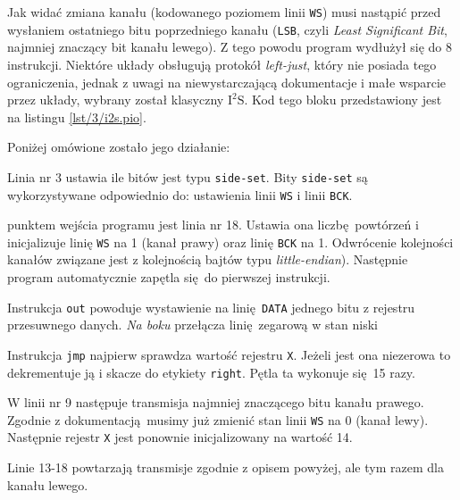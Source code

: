 \documentclass[polish]{aghengthesis}
\let\tempone\itemize
\let\temptwo\enditemize
\renewenvironment{itemize}{\tempone\setlength{\itemsep}{0cm}}{\temptwo}
\newcommand{\isqs}{$\text{I}^{2}\text{S}$}
\newcommand{\lstfile}[3]{
	\noindent
	\hspace{0.1\linewidth}
	\begin{minipage}{0.8\linewidth}
		
	\end{minipage}
	\vspace{0.3cm}
}
\begin{document}
			Jak widać zmiana kanału (kodowanego poziomem linii \lstinline|WS|)  musi nastąpić przed wysłaniem ostatniego bitu poprzedniego kanału (\lstinline|LSB|, czyli \textit{Least Significant Bit}, najmniej znaczący bit kanału lewego). Z tego powodu program wydłużył się do 8 instrukcji. Niektóre układy obsługują protokół \textit{left-just}, który nie posiada tego ograniczenia, jednak z uwagi na niewystarczającą dokumentacje i małe wsparcie przez układy, wybrany został klasyczny \isqs{}. Kod tego bloku przedstawiony jest na listingu \ref{lst/3/i2s.pio}. 
			
			\lstfile{pio}{Kod programu \isqs{}}{lst/3/i2s.pio}
			
			Poniżej omówione zostało jego działanie:
			\begin{itemize}
				\item Linia nr 3 ustawia ile bitów jest typu \lstinline|side-set|. Bity \lstinline|side-set| są wykorzystywane odpowiednio do: ustawienia linii \lstinline|WS| i linii \lstinline|BCK|.
				
				\item punktem wejścia programu jest linia nr 18. Ustawia ona liczbę powtórzeń i inicjalizuje linię \lstinline|WS| na 1 (kanał prawy) oraz linię \lstinline|BCK| na 1. Odwrócenie kolejności kanałów związane jest z kolejnością bajtów typu \textit{little-endian}). Następnie program automatycznie zapętla się do pierwszej instrukcji.
				
				\item Instrukcja \lstinline|out| powoduje wystawienie na linię \lstinline|DATA| jednego bitu z rejestru przesuwnego danych. \textit{Na boku} przełącza linię zegarową w stan niski
				
				\item Instrukcja \lstinline|jmp| najpierw sprawdza wartość rejestru \lstinline|X|. Jeżeli jest ona niezerowa to dekrementuje ją i skacze do etykiety \lstinline|right|. Pętla ta wykonuje się 15 razy.
				
				\item W linii nr 9 następuje transmisja najmniej znaczącego bitu kanału prawego. Zgodnie z dokumentacją musimy już zmienić stan linii \lstinline|WS| na 0 (kanał lewy). Następnie rejestr \lstinline|X| jest ponownie inicjalizowany na wartość 14.
				
				\item Linie 13-18 powtarzają transmisje zgodnie z opisem powyżej, ale tym razem dla kanału lewego.
			\end{itemize}
			
\end{document}
